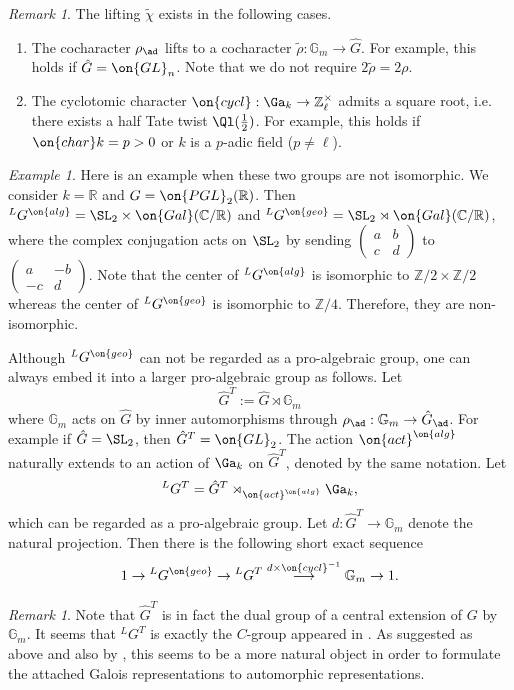 \documentclass[]{pcmi}
\theoremstyle{plain}
\theoremstyle{remark}
\newtheorem{ex}[equation]{Example}
\newtheorem{rmk}[equation]{Remark}
\theoremstyle{definition}
\newcommand{\bC}{{\mathbb C}}
\newcommand{\bG}{{\mathbb G}}
\newcommand{\bR}{{\mathbb R}}
\newcommand{\bZ}{{\mathbb Z}}
\newcommand{\Gal}{{\on{Gal}}}
\newcommand{\GL}{{\on{GL}}}
\begin{document}
\begin{rmk}\label{lifting condition}
The lifting $\tilde \chi$ exists in the following cases. 
\begin{enumerate}
\item[(i)] The cocharacter $\rho_\ad$ lifts to a  cocharacter $\tilde \rho: \bG_m\to \hat G$. For example, this holds if $\hat G=\GL_n$. Note that we do not require $2\tilde \rho=2\rho$. 
\item[(ii)]  The cyclotomic character $\on{cycl}: \Ga_k\to \bZ_\ell^\times$ admits a square root, i.e. there exists a half Tate twist $\Ql(\frac{1}{2})$. For example, this holds if $\on{char} k=p>0$ or $k$ is a $p$-adic field ($p\neq \ell$). 
\end{enumerate}
\end{rmk}



\begin{ex}\label{geom v.s. alg dual}
Here is an example when these two groups are not isomorphic. We consider $k=\bR$ and $G=\on{PGL}_2(\bR)$. Then ${^L}G^{\on{alg}}=\SL_2\times \Gal(\bC/\bR)$ and ${^L}G^{\on{geo}}=\SL_2\rtimes \Gal(\bC/\bR)$, where the complex conjugation acts on $\SL_2$ by sending $\begin{pmatrix} a & b\\ c & d \end{pmatrix}$ to $\begin{pmatrix} a & -b\\ -c & d \end{pmatrix}$. Note that the center of ${^L}G^{\on{alg}}$ is isomorphic to $\bZ/2\times \bZ/2$ whereas the center of ${^L}G^{\on{geo}}$ is isomorphic to $\bZ/4$. Therefore, they are non-isomorphic.
\end{ex}


Although ${^L}G^{\on{geo}}$ can not be regarded as a pro-algebraic group, one can always embed it into a larger pro-algebraic group as follows. Let 
\begin{equation}\label{Deligne modification}
\hat G^T:=\hat G\rtimes\bG_m
\end{equation}
where $\bG_m$ acts on $\hat G$ by inner automorphisms through  $\rho_\ad:\bG_m\to \hat G_\ad$. For example if $\hat G=\SL_2$, then $\hat G^T=\GL_2$.
The action $\on{act}^{\on{alg}}$ naturally extends to an action of $\Ga_k$ on $\hat G^T$, denoted by the same notation. Let 
$${^L} G^T=\hat G^T\rtimes_{\on{act}^{\on{alg}}}\Ga_k,$$ which can be regarded as a pro-algebraic group. Let $d: \hat G^T\to \bG_m$ denote the natural projection. Then there is the following short exact sequence
\[1\to {^L}G^{\on{geo}}\to {^L}G^T\stackrel{d\times \on{cycl}^{-1}}{\longrightarrow}\bG_m\to 1.\]
\begin{rmk}
Note that $\hat G^T$ is in fact the dual group of a central extension of $G$ by $\bG_m$. It seems that ${^L}G^T$ is exactly the $C$-group appeared in \cite[Definition 5.3.2]{BuGe}. As suggested as above and also by \cite{BuGe}, this seems to be a more natural object in order to formulate the attached Galois representations to automorphic representations.
\end{rmk}
\end{document}
